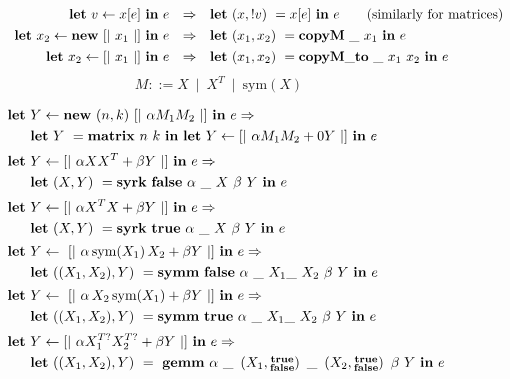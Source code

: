 \begin{figure}[t]
\begin{center}
\[\def\arraystretch{1.3}
    \begin{array}{rcl}
    \mathbf{let\ } v \leftarrow x[e]\ \mathbf{in\ } e &
    \Rightarrow &
    \mathbf{let\ } (x, !v)\ = x[e]\ \mathbf{in\ } e \qquad \textrm{(similarly for matrices)}
\\
    \mathbf{let\ } x_2 \leftarrow \mathbf{new}\ [|\ x_1\ |]\ \mathbf{in\ } e &
    \Rightarrow &
    \mathbf{let\ } (x_1, x_2)\ = \mathbf{copyM\ } \_\ x_1\ \mathbf{in\ } e
\\
    \mathbf{let\ } x_2 \leftarrow [|\ x_1\ |]\ \mathbf{in\ } e &
    \Rightarrow &
    \mathbf{let\ } (x_1, x_2)\ = \mathbf{copyM\_to\ } \_\  x_1\ x_2\ \mathbf{in\ } e
    \end{array}
\]
\[
    M ::= X\ \mid\ X^T\ \mid\ \textrm{sym}( X )
\]
\end{center}
\begin{align*}
    \mathbf{let\ } &Y \leftarrow \mathbf{new}\ (n, k)\ [|\ \alpha M_1 M_2 \ |]\ \mathbf{in\ } e
    \Rightarrow \\
    & \mathbf{let\ } Y\ = \mathbf{matrix\ } n\ k\ \mathbf{in}
    \ \mathbf{let\ } Y \leftarrow [|\ \alpha M_1 M_2 + 0Y\ |]\ \mathbf{in\ } e
\\[0.1\baselineskip]
    \mathbf{let\ } &Y \leftarrow [|\ \alpha X X^T + \beta Y\ |]\ \mathbf{in\ } e
    \Rightarrow \\
    & \mathbf{let\ } (X,Y)\ = \mathbf{syrk\ } \mathbf{false}
    \ \alpha\ \_\ X\ \beta\ Y\ \mathbf{in\ } e
\\[0.1\baselineskip]
    \mathbf{let\ } &Y \leftarrow [|\ \alpha X^T X + \beta Y\ |]\ \mathbf{in\ } e
    \Rightarrow \\
    & \mathbf{let\ } (X,Y)\ = \mathbf{syrk\ } \mathbf{true}
    \ \alpha\ \_\ X\ \beta\ Y\ \mathbf{in\ } e
\\[0.1\baselineskip]
    \mathbf{let\ } &Y \leftarrow\ [|\ \alpha\,\textrm{sym}(X_1)\,X_2 + \beta Y\ |]\ \mathbf{in\ } e
    \Rightarrow \\
    & \mathbf{let\ } ((X_1,X_2),Y)\ = \mathbf{symm\ } \mathbf{false}
        \ \alpha\ \_ \ X_1 \_\ X_2\ \beta\ Y\ \mathbf{in\ } e
\\[0.1\baselineskip]
    \mathbf{let\ } &Y \leftarrow\ [|\ \alpha\,X_2\,\textrm{sym}(X_1) + \beta Y\ |]\ \mathbf{in\ } e
    \Rightarrow \\
    & \mathbf{let\ } ((X_1,X_2),Y)\ = \mathbf{symm\ } \mathbf{true}
        \ \alpha\ \_ \ X_1 \_\ X_2\ \beta\ Y\ \mathbf{in\ } e
\\[0.1\baselineskip]
    \mathbf{let\ } &Y \leftarrow [|\ \alpha X_1^{T?} X_2^{T?} + \beta Y\ |]\ \mathbf{in\ } e
    \Rightarrow \\
    & \mathbf{let\ } ((X_1,X_2),Y)\ =\ \mathbf{gemm\ } \alpha
        \ \_\ \left(X_1, \substack{\mathbf{true}\\\mathbf{false}}\right)
        \ \_\ \left(X_2, \substack{\mathbf{true}\\\mathbf{false}}\right)
        \ \beta\ Y\ \mathbf{in\ } e
\end{align*}


\end{figure}
